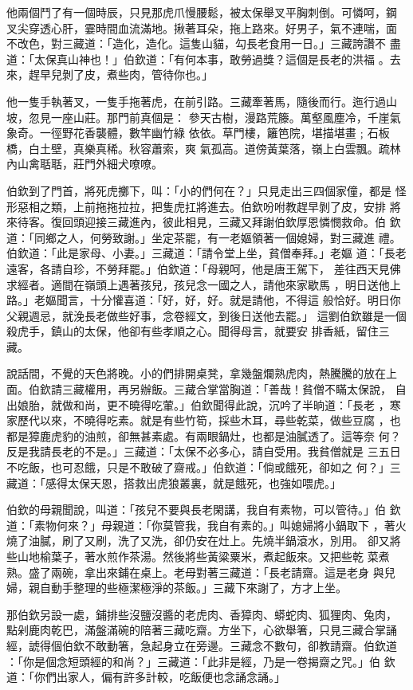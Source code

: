 \begin{pinyinscope}
{他兩個鬥了有一個時辰，只見那虎爪慢腰鬆，被太保舉叉平胸刺倒。可憐呵，鋼
叉尖穿透心肝，霎時間血流滿地。揪著耳朵，拖上路來。好男子，氣不連喘，面
不改色，對三藏道：「造化，造化。這隻山貓，勾長老食用一日。」三藏誇讚不
盡道：「太保真山神也！」伯欽道：「有何本事，敢勞過獎？這個是長老的洪福
。去來，趕早兒剝了皮，煮些肉，管待你也。」

他一隻手執著叉，一隻手拖著虎，在前引路。三藏牽著馬，隨後而行。迤行過山
坡，忽見一座山莊。那門前真個是：
參天古樹，漫路荒籐。萬壑風塵冷，千崖氣象奇。一徑野花香襲體，數竿幽竹綠
依依。草門樓，籬笆院，堪描堪畫﹔石板橋，白土壁，真樂真稀。秋容蕭索，爽
氣孤高。道傍黃葉落，嶺上白雲飄。疏林內山禽聒聒，莊門外細犬嘹嘹。

伯欽到了門首，將死虎擲下，叫：「小的們何在？」只見走出三四個家僮，都是
怪形惡相之類，上前拖拖拉拉，把隻虎扛將進去。伯欽吩咐教趕早剝了皮，安排
將來待客。復回頭迎接三藏進內，彼此相見，三藏又拜謝伯欽厚恩憐憫救命。伯
欽道：「同鄉之人，何勞致謝。」坐定茶罷，有一老嫗領著一個媳婦，對三藏進
禮。伯欽道：「此是家母、小妻。」三藏道：「請令堂上坐，貧僧奉拜。」老嫗
道：「長老遠客，各請自珍，不勞拜罷。」伯欽道：「母親呵，他是唐王駕下，
差往西天見佛求經者。適間在嶺頭上遇著孩兒，孩兒念一國之人，請他來家歇馬
，明日送他上路。」老嫗聞言，十分懽喜道：「好，好，好。就是請他，不得這
般恰好。明日你父親週忌，就浼長老做些好事，念卷經文，到後日送他去罷。」
這劉伯欽雖是一個殺虎手，鎮山的太保，他卻有些孝順之心。聞得母言，就要安
排香紙，留住三藏。

說話間，不覺的天色將晚。小的們排開桌凳，拿幾盤爛熟虎肉，熱騰騰的放在上
面。伯欽請三藏權用，再另辦飯。三藏合掌當胸道：「善哉！貧僧不瞞太保說，
自出娘胎，就做和尚，更不曉得吃葷。」伯欽聞得此說，沉吟了半晌道：「長老
，寒家歷代以來，不曉得吃素。就是有些竹筍，採些木耳，尋些乾菜，做些豆腐
，也都是獐鹿虎豹的油煎，卻無甚素處。有兩眼鍋灶，也都是油膩透了。這等奈
何？反是我請長老的不是。」三藏道：「太保不必多心，請自受用。我貧僧就是
三五日不吃飯，也可忍餓，只是不敢破了齋戒。」伯欽道：「倘或餓死，卻如之
何？」三藏道：「感得太保天恩，搭救出虎狼叢裏，就是餓死，也強如喂虎。」

伯欽的母親聞說，叫道：「孩兒不要與長老閑講，我自有素物，可以管待。」伯
欽道：「素物何來？」母親道：「你莫管我，我自有素的。」叫媳婦將小鍋取下
，著火燒了油膩，刷了又刷，洗了又洗，卻仍安在灶上。先燒半鍋滾水，別用。
卻又將些山地榆葉子，著水煎作茶湯。然後將些黃粱粟米，煮起飯來。又把些乾
菜煮熟。盛了兩碗，拿出來鋪在桌上。老母對著三藏道：「長老請齋。這是老身
與兒婦，親自動手整理的些極潔極淨的茶飯。」三藏下來謝了，方才上坐。

那伯欽另設一處，鋪排些沒鹽沒醬的老虎肉、香獐肉、蟒蛇肉、狐狸肉、兔肉，
點剁鹿肉乾巴，滿盤滿碗的陪著三藏吃齋。方坐下，心欲舉箸，只見三藏合掌誦
經，諕得個伯欽不敢動箸，急起身立在旁邊。三藏念不數句，卻教請齋。伯欽道
：「你是個念短頭經的和尚？」三藏道：「此非是經，乃是一卷揭齋之咒。」伯
欽道：「你們出家人，偏有許多計較，吃飯便也念誦念誦。」

}
\end{pinyinscope}
